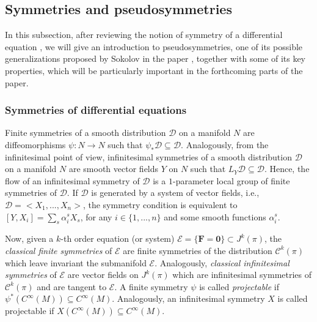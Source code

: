 \documentclass[12pt,english]{elsarticle}
\theoremstyle{plain}
\theoremstyle{plain}
\theoremstyle{remark}
\theoremstyle{plain}
\theoremstyle{definition}
\theoremstyle{definition}
\begin{document}
\subsection{Symmetries and pseudosymmetries}
\label{subsec:Symmetries-and-pseudosymmetries}

In this subsection, after reviewing the notion of symmetry of a differential
equation \cite{B_KrV,KLV,olver}, we will give an introduction to pseudosymmetries,
one of its possible generalizations proposed by Sokolov in the paper
\cite{Sokolov}, together with some of its key properties, which will be
particularly important in the forthcoming parts of the paper.

\subsubsection{Symmetries of differential equations}
\label{subsec:Symmetries-of-differential}

Finite symmetries of a smooth distribution
$\mathcal{D}$ on a manifold $N$ are diffeomorphisms
$\psi :N\rightarrow N$ such that
$\psi _{*}\mathcal{D}\subseteq \mathcal{D}$. Analogously, from the infinitesimal
point of view, infinitesimal symmetries of a smooth distribution
$\mathcal{D}$ on a manifold $N$ are smooth vector fields
$Y$ on $N$ such that $L_{Y}\mathcal{D}\subseteq \mathcal{D}$. Hence, the
flow of an infinitesimal symmetry of $\mathcal{D}$ is a $1$-parameter local
group of finite symmetries of $\mathcal{D}$. If $\mathcal{D}$ is generated
by a system of vector fields, i.e., $\mathcal{D}=<X_{1},...,X_{n}>$, the
symmetry condition is equivalent to
$[Y,X_{i}]=\sum _{s}\alpha _{i}^{s}X_{s}$, for any
$i\in \{1,...,n\}$ and some smooth functions $\alpha _{i}^{s}$.

Now, given a $k$-th order equation (or system)
$\mathcal{E}=\{\mathbf{F}=\mathbf{0}\}\subset J^{k}(\pi )$, the
\textit{classical finite symmetries} of $\mathcal{E}$ are finite symmetries
of the distribution $\mathcal{C}^{k}(\pi )$ which leave invariant the submanifold
$\mathcal{E}$. Analogously,
\textit{classical infinitesimal symmetries} of $\mathcal{E}$ are vector
fields on $J^{k}(\pi )$ which are infinitesimal symmetries of
$\mathcal{C}^{k}(\pi )$ and are tangent to $\mathcal{E}$. A finite symmetry
$\psi $ is called \textit{projectable} if
$\psi ^{*}(C^{\infty}(M))\subseteq C^{\infty}(M)$. Analogously, an infinitesimal
symmetry $X$ is called projectable if
$X(C^{\infty}(M))\subseteq C^{\infty}(M)$.
\end{document}
